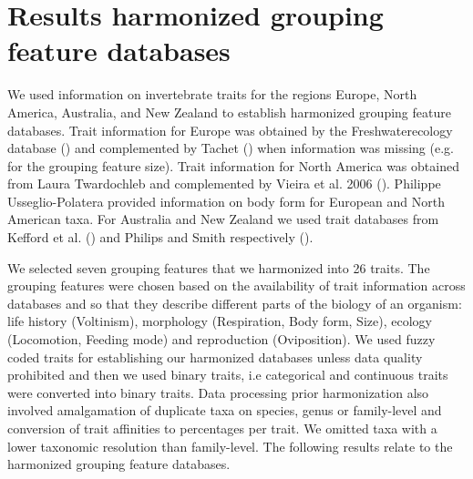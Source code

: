 \documentclass{article}
\begin{document}

\section*{Results harmonized grouping feature databases}

We used information on invertebrate traits for the regions Europe, North America, Australia, and New Zealand to establish harmonized grouping feature databases. Trait information for Europe was obtained by the Freshwaterecology database (\cite{schmidt-kloiber_www.freshwaterecology.info_2015}) and complemented by Tachet (\cite{usseglio-polatera_biomonitoring_2000}) when information was missing (e.g. for the grouping feature size). Trait information for North America was obtained from Laura Twardochleb and complemented by Vieira et al. 2006 (\cite{vieira_database_nodate}). Philippe Usseglio-Polatera provided information on body form for European and North American taxa. 
For Australia and New Zealand we used trait databases from Kefford et al. (\cite{kefford_integrated_2020}) and Philips and Smith respectively (\cite{Philips_and_Smith_NZ_DB_2018}).

We selected seven grouping features that we harmonized into 26 traits. The grouping features were chosen based on the availability of trait information across databases and so that they describe different parts of the biology of an organism: life history (Voltinism), morphology (Respiration, Body form, Size), ecology (Locomotion, Feeding mode) and reproduction (Oviposition).
We used fuzzy coded traits for establishing our harmonized databases unless data quality prohibited and then we used binary traits, i.e categorical and continuous traits were converted into binary traits. Data processing prior harmonization also involved amalgamation of duplicate taxa on species, genus or family-level and conversion of trait affinities to percentages per trait. We omitted taxa with a lower taxonomic resolution than family-level. The following results relate to the harmonized grouping feature databases. 



\newpage 

\end{document}
